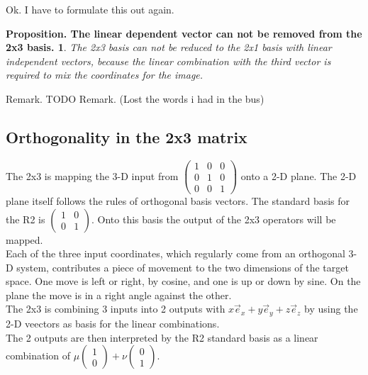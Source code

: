 \documentclass[a4paper]{article}
\begin{document}
\begin{Example}
\begin{PropositionOpt4}
Ok. I have to formulate this out again.

\newtheorem{PropositionOpt6}{Proposition. The linear dependent vector can not be removed from the 2x3 basis.}
\begin{PropositionOpt6}
The 2x3 basis can not be reduced to the 2x1 basis with linear independent vectors, because the linear combination with the third vector is required to mix the coordinates for the image.
\end{PropositionOpt6}

Remark. TODO
Remark. (Lost the words i had in the bus)



\subsection{Orthogonality in the 2x3 matrix}


The 2x3 is mapping the 3-D input from $\begin{pmatrix}1&0&0\\0&1&0\\0&0&1\end{pmatrix}$ onto a 2-D plane. The 2-D plane itself follows the rules of orthogonal basis vectors. The standard basis for the R2 is $\begin{pmatrix}1&0\\0&1\end{pmatrix}$. Onto this basis the output of the 2x3 operators will be mapped.\\

Each of the three input coordinates, which regularly come from an orthogonal 3-D system, contributes a piece of movement to the two dimensions of the target space. One move is left or right, by cosine, and one is up or down by sine. On the plane the move is in a right angle against the other.\\

The 2x3 is combining 3 inputs into 2 outputs with $x\vec{e}_x + y\vec{e}_y + z\vec{e}_z$ by using the 2-D veectors as basis for the linear combinations.\\

The 2 outputs are then interpreted by the R2 standard basis as a linear combination of $\mu\begin{pmatrix}1\\0\end{pmatrix}+\nu\begin{pmatrix}0\\1\end{pmatrix}$.


\end{PropositionOpt4}
\end{Example}
\end{document}
